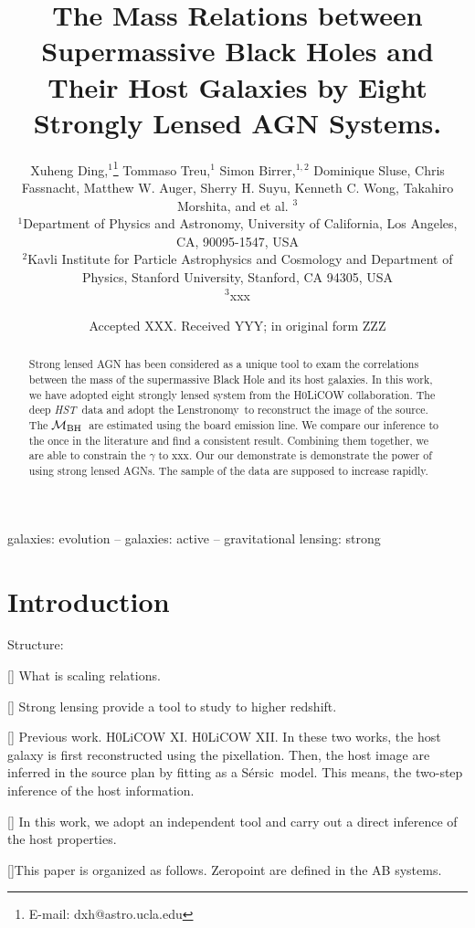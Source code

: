 \documentclass[fleqn,usenatbib]{mnras}
\title[Mass relations by lensed AGN hosts]{The Mass Relations between Supermassive Black Holes and Their Host Galaxies by Eight Strongly Lensed AGN Systems.}
\author[X. Ding et al.]{
Xuheng Ding,$^{1}$\thanks{E-mail: dxh@astro.ucla.edu}
Tommaso Treu,$^{1}$
Simon Birrer,$^{1, 2}$
Dominique Sluse,\newauthor
Chris Fassnacht,
Matthew W. Auger,
Sherry H. Suyu,
Kenneth C. Wong,\newauthor
Takahiro Morshita,
and et al. $^{3}$
\\
$^{1}$Department of Physics and Astronomy, University of California, Los Angeles, CA, 90095-1547, USA\\
$^{2}$Kavli Institute for Particle Astrophysics and Cosmology and Department of Physics, Stanford University, Stanford, CA 94305, USA\\
$^{3}$xxx
}
\date{Accepted XXX. Received YYY; in original form ZZZ}
\newcommand{\hst}{{\it HST}}
\newcommand{\mbh}{$\mathcal M_{\rm BH}$}
\newcommand{\sersic}{S\'ersic}
\newcommand{\lenstronomy}{{\sc Lenstronomy}}
\begin{document}
\label{firstpage}
\pagerange{\pageref{firstpage}--\pageref{lastpage}}
\maketitle

\begin{abstract}
Strong lensed AGN has been considered as a unique tool to exam the correlations between the mass of the supermassive Black Hole and its host galaxies. In this work, we have adopted eight strongly lensed system from the H0LiCOW collaboration. The deep \hst\ data and adopt the \lenstronomy\ to reconstruct the image of the source. The \mbh\ are estimated using the board emission line. We compare our inference to the once in the literature and find a consistent result. Combining them together, we are able to constrain the $\gamma$ to xxx. Our our demonstrate is demonstrate the power of using strong lensed AGNs. The sample of the data are supposed to increase rapidly.
\end{abstract}

\begin{keywords}
galaxies: evolution -- galaxies: active -- gravitational lensing: strong
\end{keywords}



\section{Introduction}
Structure:

[] What is scaling relations.

[] Strong lensing provide a tool to study to higher redshift.

[] Previous work. H0LiCOW XI. H0LiCOW XII. In these two works, the host galaxy is first reconstructed using the pixellation. Then, the host image are inferred in the source plan by fitting as a \sersic\ model. This means, the two-step inference of the host information. 

[] In this work, we adopt an independent tool and carry out a direct inference of the host properties. 

[]This paper is organized as follows. Zeropoint are defined in the AB systems.
\end{document}
